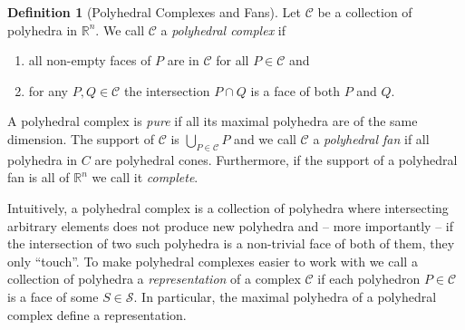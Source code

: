 \documentclass[
  paper=a4,
  titlepage,
  bibliography=totoc,
  listof=totoc,
  pagesize=pdftex
]{scrartcl}
\numberwithin{figure}{section}
\numberwithin{equation}{section}
\numberwithin{table}{section}
\newcommand*\setR{\mathds{R}}
\theoremstyle{definition}
\newtheorem{definition}{Definition}
\numberwithin{definition}{section}
\begin{document}
\begin{definition}[Polyhedral Complexes and Fans]
  \label{def:polyhedralFan}
  Let $\mathcal C$ be a collection of polyhedra in $\setR^n$. We call $\mathcal C$ a
  \emph{polyhedral complex} if
  \begin{enumerate}
    \item all non-empty faces of $P$ are in $\mathcal C$ for all $P \in \mathcal C$ and
    \item for any $P,Q \in \mathcal C$ the intersection $P\cap Q$ is a face of both $P$
      and $Q$.
  \end{enumerate}
  A polyhedral complex is \emph{pure} if all its maximal polyhedra are of the same
  dimension. The support of $\mathcal C$ is $\bigcup_{P\in\mathcal C}P$ and we call
  $\mathcal C$ a \emph{polyhedral fan} if all polyhedra in $C$ are polyhedral cones.
  Furthermore, if the support of a polyhedral fan is all of $\setR^n$ we call it
  \emph{complete}.
\end{definition}

Intuitively, a polyhedral complex is a collection of polyhedra where intersecting
arbitrary elements does not produce new polyhedra and -- more importantly -- if the
intersection of two such polyhedra is a non-trivial face of both of them, they only
\enquote{touch}. To make polyhedral complexes easier to work with we call a collection of
polyhedra a \emph{representation} of a complex $\mathcal C$ if each polyhedron $P \in
\mathcal C$ is a face of some $S \in \mathcal S$. In particular, the maximal polyhedra of
a polyhedral complex define a representation.
\end{document}
